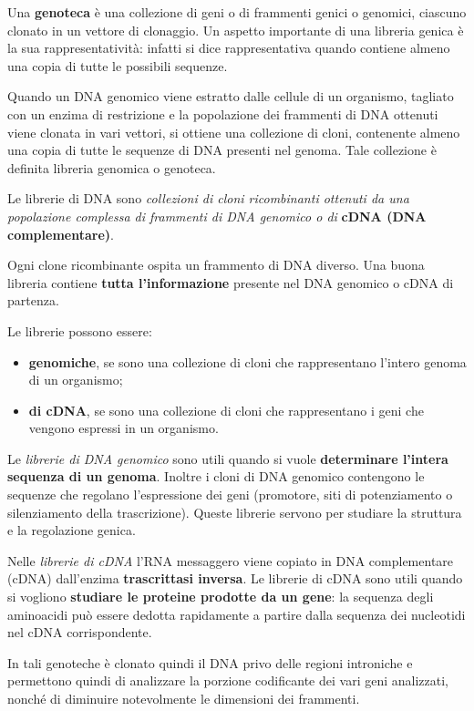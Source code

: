 \documentclass[]{article}
\begin{document}
Una \textbf{genoteca} è una collezione di geni o di frammenti genici o
genomici, ciascuno clonato in un vettore di clonaggio. Un aspetto
importante di una libreria genica è la sua rappresentatività: infatti si
dice rappresentativa quando contiene almeno una copia di tutte le
possibili sequenze.

Quando un DNA genomico viene estratto dalle cellule di un organismo,
tagliato con un enzima di restrizione e la popolazione dei frammenti di
DNA ottenuti viene clonata in vari vettori, si ottiene una collezione di
cloni, contenente almeno una copia di tutte le sequenze di DNA presenti
nel genoma. Tale collezione è definita libreria genomica o genoteca.

Le librerie di DNA sono \emph{collezioni di cloni ricombinanti ottenuti
da una popolazione complessa di frammenti di DNA genomico o di}
\textbf{cDNA (DNA complementare)}.

Ogni clone ricombinante ospita un frammento di DNA diverso. Una buona
libreria contiene \textbf{tutta l'informazione} presente nel DNA
genomico o cDNA di partenza.

Le librerie possono essere:

\begin{itemize}
\itemsep1pt\parskip0pt
\item
  \textbf{genomiche}, se sono una collezione di cloni che rappresentano
  l'intero genoma di un organismo;
\item
  \textbf{di cDNA}, se sono una collezione di cloni che rappresentano i
  geni che vengono espressi in un organismo.
\end{itemize}

Le \emph{librerie di DNA genomico} sono utili quando si vuole
\textbf{determinare l'intera sequenza di un genoma}. Inoltre i cloni di
DNA genomico contengono le sequenze che regolano l'espressione dei geni
(promotore, siti di potenziamento o silenziamento della trascrizione).
Queste librerie servono per studiare la struttura e la regolazione
genica.

Nelle \emph{librerie di cDNA} l'RNA messaggero viene copiato in DNA
complementare (cDNA) dall'enzima \textbf{trascrittasi inversa}. Le
librerie di cDNA sono utili quando si vogliono \textbf{studiare le
proteine prodotte da un gene}: la sequenza degli aminoacidi può essere
dedotta rapidamente a partire dalla sequenza dei nucleotidi nel cDNA
corrispondente.

In tali genoteche è clonato quindi il DNA privo delle regioni introniche
e permettono quindi di analizzare la porzione codificante dei vari geni
analizzati, nonché di diminuire notevolmente le dimensioni dei
frammenti.
\end{document}

